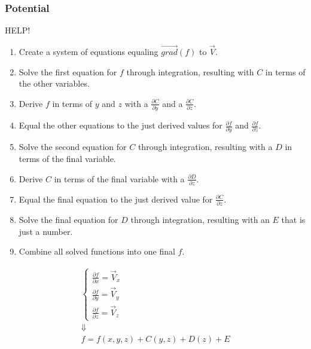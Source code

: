 \documentclass{article}
\begin{document}
\subsubsection{Potential}
HELP!
\begin{enumerate}
\item Create a system of equations equaling $\overrightarrow{grad}(f)$ to $\vec{V}$.
\item Solve the first equation for $f$ through integration, resulting with $C$ in terms of the other variables.
\item Derive $f$ in terms of $y$ and $z$ with a $\frac{\partial C}{\partial y}$ and a $\frac{\partial C}{\partial z}$.
\item Equal the other equations to the just derived values for $\frac{\partial f}{\partial y}$ and $\frac{\partial f}{\partial z}$.
\item Solve the second equation for $C$ through integration, resulting with a $D$ in terms of the final variable.
\item Derive $C$ in terms of the final variable with a $\frac{\partial D}{\partial z}$.
\item Equal the final equation to the just derived value for $\frac{\partial C}{\partial z}$.
\item Solve the final equation for $D$ through integration, resulting with an $E$ that is just a number.
\item Combine all solved functions into one final $f$.
\end{enumerate}
\begin{gather*}
\left\{\begin{matrix}
\frac{\partial f}{\partial x} = \vec{V}_x \\
\frac{\partial f}{\partial y} = \vec{V}_y \\
\frac{\partial f}{\partial z} = \vec{V}_z
\end{matrix}\right. \\
\Downarrow \\
f = f(x,y,z) + C(y,z) + D(z) + E
\end{gather*}
\end{document}
